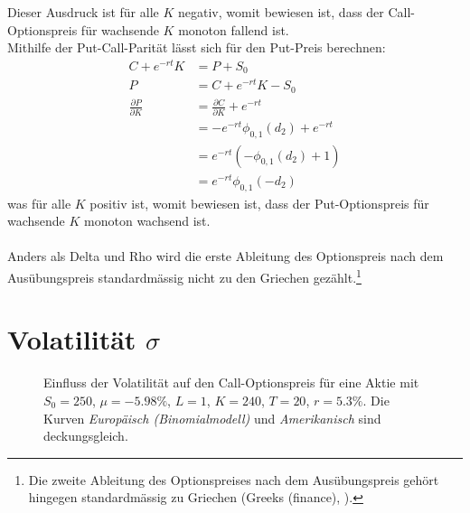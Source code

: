 \documentclass[11pt]{report} %
\newcommand\pd[2]{\displaystyle\frac{\partial #1}{\partial #2}}
\begin{document}
Dieser Ausdruck ist für alle $K$ negativ, womit bewiesen ist, dass der Call-Optionspreis für wachsende $K$ monoton fallend ist. \\Mithilfe der Put-Call-Parität lässt sich für den Put-Preis berechnen:
    \begin{align*}
    C+e^{-rt}K&=P+S_0\\
    P&=C+e^{-rt}K-S_0\\
    \pd{P}{K}&=\pd{C}{K}+e^{-rt}\\
    &=-e^{-rt}\phi_{0, 1}(d_2)+e^{-rt}\\
    &=e^{-rt}\left(-\phi_{0, 1}(d_2)+1\right)\\
    &=e^{-rt}\phi_{0, 1}(-d_2)
\end{align*}
was für alle $K$ positiv ist, womit bewiesen ist, dass der Put-Optionspreis für wachsende $K$ monoton wachsend ist. \\\\Anders als Delta und Rho wird die erste Ableitung des Optionspreis nach dem Ausübungspreis standardmässig nicht zu den Griechen gezählt.\footnote{Die zweite Ableitung des Optionspreises nach dem Ausübungspreis gehört hingegen standardmässig zu Griechen (Greeks (finance), \cite{wikigreek2024}).}

\section{Volatilität $\sigma$}

\begin{figure}[H]
    \centering
    \caption{Einfluss der Volatilität auf den Call-Optionspreis für eine Aktie mit $S_0=250$, $\mu=-5.98\%$, $L=1$, $K=240$, $T=20$, $r=5.3\%$. Die Kurven \textit{Europäisch (Binomialmodell)} und \textit{Amerikanisch} sind deckungsgleich.}
    \label{fig:sigma-call}
\end{figure}
\end{document}

